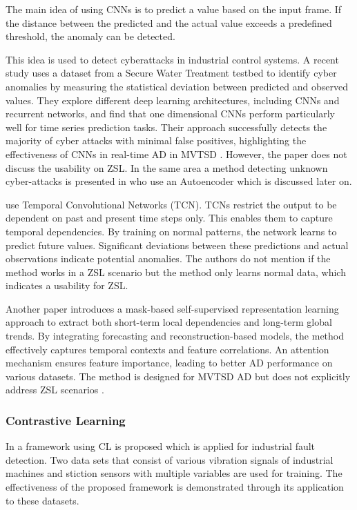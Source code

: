 The main idea of using CNNs is to predict a value based on the input frame. If the distance between the predicted and the actual value exceeds a predefined threshold, the anomaly can be detected.

This idea is used to detect cyberattacks in industrial control systems. A recent study uses a dataset from a Secure Water Treatment testbed to identify cyber anomalies by measuring the statistical deviation between predicted and observed values. They explore different deep learning architectures, including CNNs and recurrent networks, and find that one dimensional CNNs perform particularly well for time series prediction tasks. Their approach successfully detects the majority of cyber attacks with minimal false positives, highlighting the effectiveness of CNNs in real-time AD in MVTSD \cite{kravchik_detecting_2018}. However, the paper does not discuss the usability on ZSL. In the same area a method detecting unknown cyber-attacks is presented in \cite{zhang_unknown_2020} who use an Autoencoder which is discussed later on.

\cite{he_temporal_2019} use Temporal Convolutional Networks (TCN). TCNs restrict the output to be dependent on past and present time steps only. This enables them to capture temporal dependencies. By training on normal patterns, the network learns to predict future values. Significant deviations between these predictions and actual observations indicate potential anomalies. The authors do not mention if the method works in a ZSL scenario but the method only learns normal data, which indicates a usability for ZSL.

Another paper introduces a mask-based self-supervised representation learning approach to extract both short-term local dependencies and long-term global trends. By integrating forecasting and reconstruction-based models, the method effectively captures temporal contexts and feature correlations. An attention mechanism ensures feature importance, leading to better AD performance on various datasets. The method is designed for MVTSD AD but does not explicitly address ZSL scenarios \cite{miao_unsupervised_2022}.

\subsubsection{Contrastive Learning}
In \cite{zhang_debiased_2024} a framework using CL is proposed which is applied for industrial fault detection. Two data sets that consist of various vibration signals of industrial machines and stiction sensors with multiple variables are used for training. The effectiveness of the proposed framework is demonstrated through its application to these datasets.

